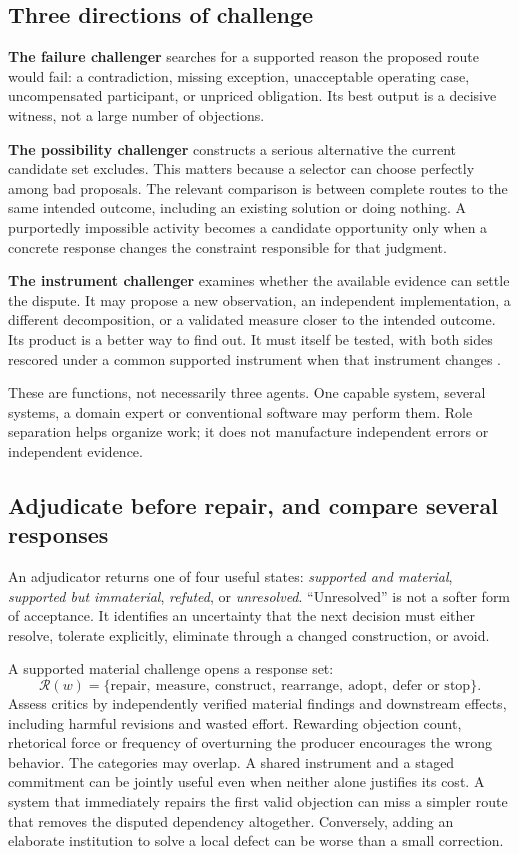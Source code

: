 \subsection{Three directions of challenge}
\textbf{The failure challenger} searches for a supported reason the proposed route would fail: a contradiction, missing exception, unacceptable operating case, uncompensated participant, or unpriced obligation. Its best output is a decisive witness, not a large number of objections.

\textbf{The possibility challenger} constructs a serious alternative the current candidate set excludes. This matters because a selector can choose perfectly among bad proposals. The relevant comparison is between complete routes to the same intended outcome, including an existing solution or doing nothing. A purportedly impossible activity becomes a candidate opportunity only when a concrete response changes the constraint responsible for that judgment.

\textbf{The instrument challenger} examines whether the available evidence can settle the dispute. It may propose a new observation, an independent implementation, a different decomposition, or a validated measure closer to the intended outcome. Its product is a better way to find out. It must itself be tested, with both sides rescored under a common supported instrument when that instrument changes \citep[\S7]{boucher_ti}.

These are functions, not necessarily three agents. One capable system, several systems, a domain expert or conventional software may perform them. Role separation helps organize work; it does not manufacture independent errors or independent evidence.

\subsection{Adjudicate before repair, and compare several responses}
An adjudicator returns one of four useful states: \emph{supported and material}, \emph{supported but immaterial}, \emph{refuted}, or \emph{unresolved}. ``Unresolved'' is not a softer form of acceptance. It identifies an uncertainty that the next decision must either resolve, tolerate explicitly, eliminate through a changed construction, or avoid.

A supported material challenge opens a response set:
\begin{equation}
\mathcal R(w)=\{\text{repair},\ \text{measure},\ \text{construct},\ \text{rearrange},\ \text{adopt},\ \text{defer or stop}\}.
\end{equation}
Assess critics by independently verified material findings and downstream effects, including harmful revisions and wasted effort. Rewarding objection count, rhetorical force or frequency of overturning the producer encourages the wrong behavior. The categories may overlap. A shared instrument and a staged commitment can be jointly useful even when neither alone justifies its cost. A system that immediately repairs the first valid objection can miss a simpler route that removes the disputed dependency altogether. Conversely, adding an elaborate institution to solve a local defect can be worse than a small correction.

